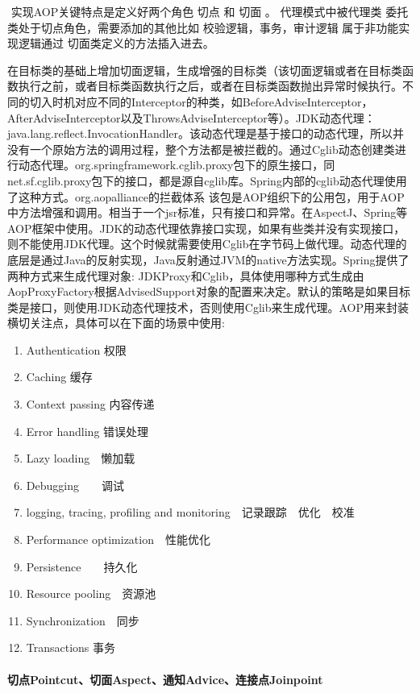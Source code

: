 \documentclass[../../../interview-questions.tex]{subfiles}
\begin{document}
​ 实现AOP关键特点是定义好两个角色 切点 和 切面 。 代理模式中被代理类 委托类处于切点角色，需要添加的其他比如 校验逻辑，事务，审计逻辑 属于非功能实现逻辑通过 切面类定义的方法插入进去。

在目标类的基础上增加切面逻辑，生成增强的目标类（该切面逻辑或者在目标类函数执行之前，或者目标类函数执行之后，或者在目标类函数抛出异常时候执行。不同的切入时机对应不同的Interceptor的种类，如BeforeAdviseInterceptor，AfterAdviseInterceptor以及ThrowsAdviseInterceptor等）。JDK动态代理：java.lang.reflect.InvocationHandler。该动态代理是基于接口的动态代理，所以并没有一个原始方法的调用过程，整个方法都是被拦截的。通过Cglib动态创建类进行动态代理。org.springframework.cglib.proxy包下的原生接口，同net.sf.cglib.proxy包下的接口，都是源自cglib库。Spring内部的cglib动态代理使用了这种方式。org.aopalliance的拦截体系
该包是AOP组织下的公用包，用于AOP中方法增强和调用。相当于一个jsr标准，只有接口和异常。在AspectJ、Spring等AOP框架中使用。JDK的动态代理依靠接口实现，如果有些类并没有实现接口，则不能使用JDK代理。这个时候就需要使用Cglib在字节码上做代理。动态代理的底层是通过Java的反射实现，Java反射通过JVM的native方法实现。Spring提供了两种方式来生成代理对象: JDKProxy和Cglib，具体使用哪种方式生成由AopProxyFactory根据AdvisedSupport对象的配置来决定。默认的策略是如果目标类是接口，则使用JDK动态代理技术，否则使用Cglib来生成代理。AOP用来封装横切关注点，具体可以在下面的场景中使用:

\begin{enumerate}
    \item {Authentication 权限}
    \item {Caching 缓存}
    \item {Context passing 内容传递}
    \item {Error handling 错误处理}
    \item {Lazy loading　懒加载}
    \item {Debugging　　调试}
    \item {logging, tracing, profiling and monitoring　记录跟踪　优化　校准}
    \item {Performance optimization　性能优化}
    \item {Persistence　　持久化}
    \item {Resource pooling　资源池}
    \item {Synchronization　同步}
    \item {Transactions 事务}
\end{enumerate}

\paragraph{切点Pointcut、切面Aspect、通知Advice、连接点Joinpoint}
\end{document}
